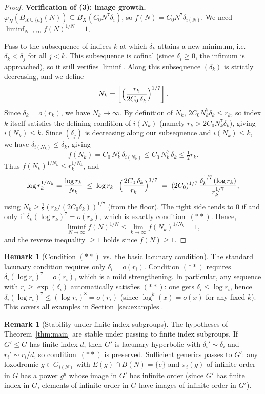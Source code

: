 \documentclass[12pt]{amsart}
\theoremstyle{plain}
\theoremstyle{definition}
\newtheorem{remark}[theorem]{Remark}
\begin{document}
\begin{proof}
\medskip\noindent\textbf{Verification of (3): image growth.}
$\varphi_N(B_{X\cup\{a\}}(N)) \subseteq B_X(C_0 N^{7}\delta_i)$, so
$f(N) = C_0 N^{7}\delta_{i(N)}$.
We need $\liminf_{N\to\infty} f(N)^{1/N} = 1$.

Pass to the subsequence of indices $k$ at which $\delta_k$ attains a new minimum,
i.e.\ $\delta_k < \delta_j$ for all $j < k$.
This subsequence is cofinal (since $\delta_i \geq 0$, the infimum is approached),
so it still verifies $\liminf$.
Along this subsequence $(\delta_k)$ is strictly decreasing, and we define
\[
  N_k = \left\lfloor \Bigl(\frac{r_k}{2C_0\,\delta_k}\Bigr)^{1/7} \right\rfloor.
\]
Since $\delta_k = o(r_k)$, we have $N_k \to \infty$.
By definition of $N_k$, $2C_0 N_k^7 \delta_k \leq r_k$, so index $k$ itself
satisfies the defining condition of $i(N_k)$ (namely $r_k > 2C_0 N_k^7 \delta_k$),
giving $i(N_k) \leq k$.
Since $(\delta_j)$ is decreasing along our subsequence and $i(N_k) \leq k$, we have
$\delta_{i(N_k)} \leq \delta_k$, giving
\[
  f(N_k) = C_0\,N_k^{7}\,\delta_{i(N_k)} \leq C_0\,N_k^{7}\,\delta_k \leq \tfrac{1}{2}r_k.
\]
Thus $f(N_k)^{1/N_k} \leq r_k^{1/N_k}$, and
\[
  \log r_k^{1/N_k} = \frac{\log r_k}{N_k}
  \;\leq\; \log r_k \cdot \Bigl(\frac{2C_0\,\delta_k}{r_k}\Bigr)^{1/7}
  \;=\; (2C_0)^{1/7}\,\frac{\delta_k^{1/7}\,(\log r_k)}{r_k^{1/7}},
\]
using $N_k \geq \tfrac{1}{2}(r_k/(2C_0\delta_k))^{1/7}$ (from the floor).
The right side tends to $0$ if and only if $\delta_k(\log r_k)^{7} = o(r_k)$,
which is exactly condition~$(**)$.
Hence, $$\liminf_{N\to\infty} f(N)^{1/N} \leq \lim_{k\to\infty} f(N_k)^{1/N_k} = 1,$$
and the reverse inequality $\geq 1$ holds since $f(N) \geq 1$.
\end{proof}

\begin{remark}[Condition $(**)$ vs.\ the basic lacunary condition]
The standard lacunary condition requires only $\delta_i = o(r_i)$.
Condition $(**)$ requires $\delta_i(\log r_i)^{7} = o(r_i)$, which is a mild strengthening.
In particular, any sequence with $r_i \geq \exp(\delta_i)$ automatically satisfies $(**)$:
one gets $\delta_i \leq \log r_i$, hence $\delta_i(\log r_i)^{7} \leq (\log r_i)^{8} = o(r_i)$
(since $\log^k(x) = o(x)$ for any fixed $k$).
This covers all examples in Section~\ref{sec:examples}.
\end{remark}

\begin{remark}[Stability under finite index subgroups]
The hypotheses of Theorem~\ref{thm:main} are stable under passing to finite index subgroups.
If $G' \leq G$ has finite index $d$, then $G'$ is lacunary hyperbolic with $\delta_i' \sim \delta_i$
and $r_i' \sim r_i/d$, so condition~$(**)$ is preserved.
Sufficient generics passes to $G'$: any loxodromic $g \in G_{i(N)}$ with
$E(g) \cap B(N) = \{e\}$ and $\pi_i(g)$ of infinite order in $G$ has a power
$g^d$ whose image in $G'$ has infinite order (since $G'$ has finite index in $G$,
elements of infinite order in $G$ have images of infinite order in $G'$).
\end{remark}
\end{document}
